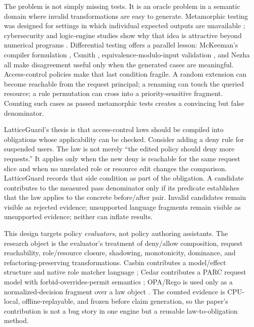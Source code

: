 \documentclass[10pt,conference]{IEEEtran}
\begin{document}
The problem is not simply missing tests.  It is an oracle problem in a semantic domain where invalid transformations are easy to generate.  Metamorphic testing was designed for settings in which individual expected outputs are unavailable \cite{segura2016survey}; cybersecurity and logic-engine studies show why that idea is attractive beyond numerical programs \cite{chen2016mtcybersecurity} \cite{mansur2023datalog}.  Differential testing offers a parallel lesson: McKeeman's compiler formulation \cite{mckeeman1998differential}, Csmith \cite{yang2011csmith}, equivalence-modulo-input validation \cite{le2014emi}, and Nezha \cite{petsios2017nezha} all make disagreement useful only when the generated cases are meaningful.  Access-control policies make that last condition fragile.  A random extension can become reachable from the request principal; a renaming can touch the queried resource; a rule permutation can cross into a priority-sensitive fragment.  Counting such cases as passed metamorphic tests creates a convincing but false denominator.

LatticeGuard's thesis is that access-control laws should be compiled into obligations whose applicability can be checked.  Consider adding a deny rule for suspended users.  The law is not merely ``the edited policy should deny more requests.''  It applies only when the new deny is reachable for the same request slice and when no unrelated role or resource edit changes the comparison.  LatticeGuard records that side condition as part of the obligation.  A candidate contributes to the measured pass denominator only if its predicate establishes that the law applies to the concrete before/after pair.  Invalid candidates remain visible as rejected evidence; unsupported language fragments remain visible as unsupported evidence; neither can inflate results.

This design targets policy \emph{evaluators}, not policy authoring assistants.  The research object is the evaluator's treatment of deny/allow composition, request reachability, role/resource closure, shadowing, monotonicity, dominance, and refactoring-preserving transformations.  Casbin contributes a model/effect structure and native role matcher language \cite{casbin_model_docs} \cite{casbin_effect_docs}; Cedar contributes a PARC request model with forbid-overrides-permit semantics \cite{cedar_authz_docs} \cite{cedar_request_docs}; OPA/Rego is used only as a normalized-decision fragment over a law object \cite{opa_language_docs} \cite{opa_cli_docs}.  The counted evidence is CPU-local, offline-replayable, and frozen before claim generation, so the paper's contribution is not a bug story in one engine but a reusable law-to-obligation method.
\end{document}
